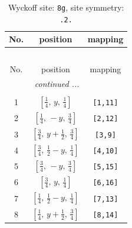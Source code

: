 \documentclass[fleqn,8pt]{jsarticle}
\begin{document}
\renewcommand{\arraystretch}{1.2}
\begin{longtable}{ccc}
\caption{Wyckoff site: {\tt 8g}, site symmetry: {\tt .2.}}
 \\
 \hline \hline
No. & position & mapping \\ \hline \endfirsthead

\multicolumn{2}{l}{\tablename\ \thetable{}} \\
 \hline \hline
No. & position & mapping \\ \hline \endhead

 \hline \hline
\multicolumn{2}{r}{\footnotesize\it continued ...} \\ \endfoot

 \hline \hline
\multicolumn{2}{r}{} \\ \endlastfoot

1 & $\left[ \frac{1}{4},\, y,\, \frac{1}{4} \right]$ & {\tt [1,11]} \\ \hline
2 & $\left[ \frac{1}{4},\, - y,\, \frac{3}{4} \right]$ & {\tt [2,12]} \\ \hline
3 & $\left[ \frac{3}{4},\, y + \frac{1}{2},\, \frac{3}{4} \right]$ & {\tt [3,9]} \\ \hline
4 & $\left[ \frac{3}{4},\, \frac{1}{2} - y,\, \frac{1}{4} \right]$ & {\tt [4,10]} \\ \hline
5 & $\left[ \frac{3}{4},\, - y,\, \frac{3}{4} \right]$ & {\tt [5,15]} \\ \hline
6 & $\left[ \frac{3}{4},\, y,\, \frac{1}{4} \right]$ & {\tt [6,16]} \\ \hline
7 & $\left[ \frac{1}{4},\, \frac{1}{2} - y,\, \frac{1}{4} \right]$ & {\tt [7,13]} \\ \hline
8 & $\left[ \frac{1}{4},\, y + \frac{1}{2},\, \frac{3}{4} \right]$ & {\tt [8,14]} \\
\end{longtable}
\renewcommand{\arraystretch}{1.2}
\end{document}
